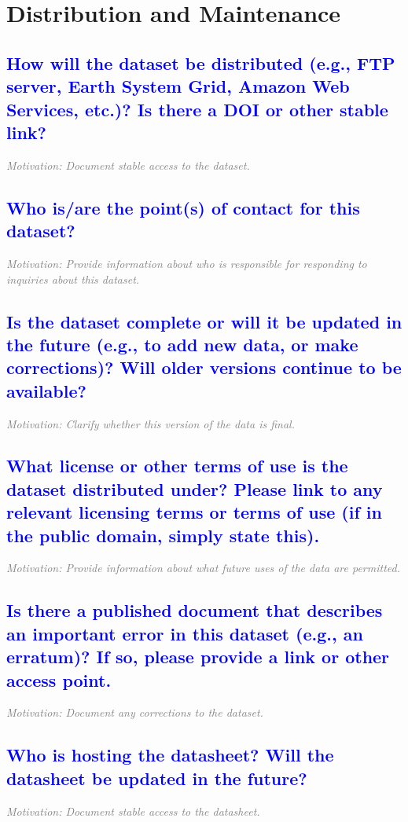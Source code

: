 \documentclass[letterpaper, 10 pt, transmag]{IEEEtran}
\begin{document}
\section{Distribution and Maintenance}

\textcolor{blue}{\subsection{How will the dataset be distributed (e.g., FTP server, Earth System Grid, Amazon Web Services, etc.)? Is there a DOI or other stable link?}}
\textcolor{gray}{\textit{Motivation: Document stable access to the dataset.}}

\textcolor{blue}{\subsection{Who is/are the point(s) of contact for this dataset?}}
\textcolor{gray}{\textit{Motivation: Provide information about who is responsible for responding to inquiries about this dataset.}}

\textcolor{blue}{\subsection{Is the dataset complete or will it be updated in the future (e.g., to add new data, or make corrections)? Will older versions continue to be available?}}
\textcolor{gray}{\textit{Motivation: Clarify whether this version of the data is final.}}

\textcolor{blue}{\subsection{What license or other terms of use is the dataset distributed under? Please link to any relevant licensing terms or terms of use (if in the public domain, simply state this).}}
\textcolor{gray}{\textit{Motivation: Provide information about what future uses of the data are permitted.}}

\textcolor{blue}{\subsection{Is there a published document that describes an important error in this dataset (e.g., an erratum)? If so, please provide a link or other access point.}}
\textcolor{gray}{\textit{Motivation: Document any corrections to the dataset.}}

\textcolor{blue}{\subsection{Who is hosting the datasheet? Will the datasheet be updated in the future?}}
\textcolor{gray}{\textit{Motivation: Document stable access to the datasheet.}}
\end{document}
